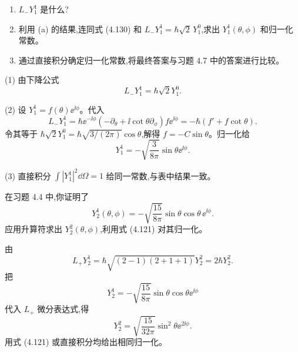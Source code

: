 \begin{question}
\begin{enumerate}
\item $L_-Y_1^1$ 是什么?
\item 利用 (a) 的结果,连同式 (4.130) 和 $L_-Y_1^1=\hbar\sqrt2\,Y_1^0$,求出 $Y_1^1(\theta,\phi)$ 和归一化常数。
\item 通过直接积分确定归一化常数,将最终答案与习题 4.7 中的答案进行比较。
\end{enumerate}

\par\smallskip
{}

\end{question}
\begin{solution}

(1) 由下降公式
\[
L_-Y_1^1=\hbar\sqrt{2}Y_1^0.
\]

(2) 设 $Y_1^1=f(\theta)\ee^{\ii\phi}$。代入
\[
L_-Y_1^1=\hbar \ee^{-\ii\phi}\left(-\partial_\theta+\ii\cot\theta\partial_\phi\right)f \ee^{\ii\phi}
=-\hbar(f'+f\cot\theta).
\]
令其等于 $\hbar\sqrt2Y_1^0=\hbar\sqrt{3/(2\pi)}\cos\theta$,解得 $f=-C\sin\theta$。归一化给
\[
Y_1^1=-\sqrt{\frac{3}{8\pi}}\sin\theta \ee^{\ii\phi}.
\]

(3) 直接积分 $\int|Y_1^1|^2\dd\Omega=1$ 给同一常数,与表中结果一致。

\end{solution}

\begin{question}
在习题 4.4 中,你证明了
\[
Y_2^1(\theta,\phi)=-\sqrt{\frac{15}{8\pi}}\sin\theta\cos\theta\,\ee^{\ii\phi}.
\]
应用升算符求出 $Y_2^2(\theta,\phi)$,利用式 (4.121) 对其归一化。

\par\smallskip
{}

\end{question}
\begin{solution}

由
\[
L_+Y_2^1=\hbar\sqrt{(2-1)(2+1+1)}Y_2^2=2\hbar Y_2^2.
\]
把
\[
Y_2^1=-\sqrt{\frac{15}{8\pi}}\sin\theta\cos\theta \ee^{\ii\phi}
\]
代入 $L_+$ 微分表达式,得
\[
Y_2^2=\sqrt{\frac{15}{32\pi}}\sin^2\theta \ee^{2\ii\phi}.
\]
用式 (4.121) 或直接积分均给出相同归一化。

\end{solution}

